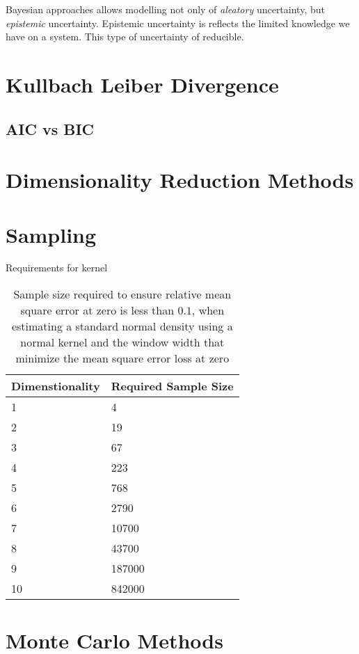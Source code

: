 Bayesian approaches allows modelling not only of \emph{aleatory} uncertainty, but \emph{epistemic} uncertainty.  Epistemic uncertainty is reflects the limited knowledge we have on a system.   This type of uncertainty of reducible.

\section{Kullbach Leiber Divergence}

\subsection{AIC vs BIC}

\section{Dimensionality Reduction Methods}

\section{Sampling}

Requirements for kernel
\begin{table}[htbp]
   \caption{Sample size required to ensure relative mean square error at zero is
       less than $0.1$, when estimating a standard normal density using a normal
       kernel and the window width that minimize the mean square error loss at
       zero\cite{silverman1986_density_estimation}}
   \label{tab:kde_sample_req}
   \begin{tabularx}{6.5in}{XX}
     \hline
     Dimenstionality & Required Sample Size \\
     \hline
     1 & 4 \\
     2 & 19 \\
     3 & 67 \\
     4 & 223 \\
     5 & 768 \\
     6 & 2790 \\
     7 & 10700 \\
     8 & 43700 \\
     9 & 187000 \\
     10 & 842000 \\
     \hline
   \end{tabularx}
\end{table}

\section{Monte Carlo Methods}

